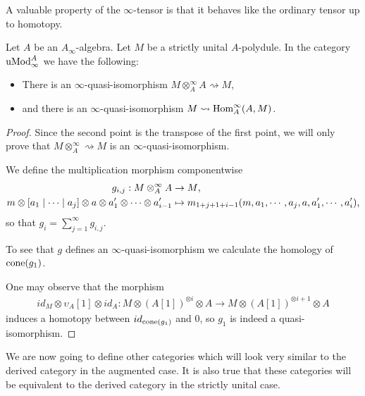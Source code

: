 \documentclass[../thesis.tex]{subfiles}
\begin{document}
            A valuable property of the $\infty$-tensor is that it behaves like the ordinary tensor up to homotopy.

            \begin{lemma}\label{lem: tensor-hom-qiso}
                Let $A$ be an $A_\infty$-algebra. Let $M$ be a strictly unital $A$-polydule. In the category $\tt{uMod}_\infty^A$ we have the following:
                \begin{itemize}
                    \item There is an $\infty$-quasi-isomorphism $M \otimes_A^\infty A \rightsquigarrow M$,
                    \item and there is an $\infty$-quasi-isomorphism $M \rightsquigarrow \tt{Hom}_A^\infty(A,M)$.
                \end{itemize}
            \end{lemma}

            \begin{proof}
                Since the second point is the transpose of the first point, we will only prove that $M \otimes_A^\infty \rightsquigarrow M$ is an $\infty$-quasi-isomorphism.

                We define the multiplication morphism componentwise
                \begin{align*}
                    g_{i,j} : M \otimes_A^\infty A & \rightarrow M\tt{,} \\
                    m \otimes [a_1\mid \cdots \mid a_{j}] \otimes a \otimes a'_1 \otimes \cdots \otimes a'_{i-1} & \mapsto m_{1+j+1+i-1}(m,a_1,\cdots,a_j,a,a'_1,\cdots,a'_i)\tt{,}
                \end{align*}
                so that $g_i = \sum_{j=1}^\infty g_{i,j}$.

                To see that $g$ defines an $\infty$-quasi-isomorphism we calculate the homology of $\tt{cone}(g_1)$.

                One may observe that the morphism 
                \begin{align*}
                    id_M \otimes \upsilon_A[1] \otimes id_A : M \otimes (A[1])^{\otimes i} \otimes A \rightarrow M \otimes (A[1])^{\otimes i+1} \otimes A
                \end{align*}
                induces a homotopy between $id_{\tt{cone}(g_1)}$ and $0$, so $g_1$ is indeed a quasi-isomorphism.
            \end{proof}

            We are now going to define other categories which will look very similar to the derived category in the augmented case. It is also true that these categories will be equivalent to the derived category in the strictly unital case.
\end{document}
